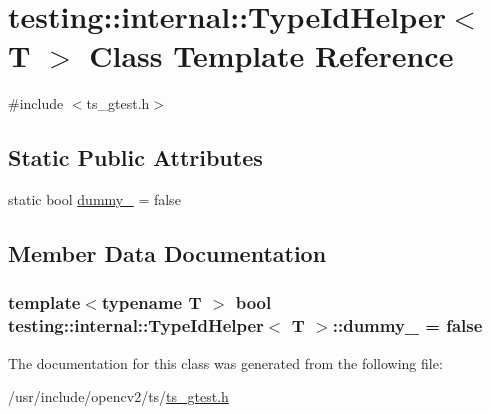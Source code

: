 \hypertarget{classtesting_1_1internal_1_1TypeIdHelper}{\section{testing\-:\-:internal\-:\-:Type\-Id\-Helper$<$ T $>$ Class Template Reference}
\label{classtesting_1_1internal_1_1TypeIdHelper}
}


{\ttfamily \#include $<$ts\-\_\-gtest.\-h$>$}

\subsection*{Static Public Attributes}
\begin{DoxyCompactItemize}
\item 
static bool \hyperlink{classtesting_1_1internal_1_1TypeIdHelper_a372268b1520d965d0bdf01ebad3d270e}{dummy\-\_\-} = false
\end{DoxyCompactItemize}


\subsection{Member Data Documentation}
\hypertarget{classtesting_1_1internal_1_1TypeIdHelper_a372268b1520d965d0bdf01ebad3d270e}{
\subsubsection[{dummy\-\_\-}]{\setlength{\rightskip}{0pt plus 5cm}template$<$typename T $>$ bool {\bf testing\-::internal\-::\-Type\-Id\-Helper}$<$ {\bf T} $>$\-::dummy\-\_\- = false\hspace{0.3cm}{\ttfamily [static]}}}\label{classtesting_1_1internal_1_1TypeIdHelper_a372268b1520d965d0bdf01ebad3d270e}


The documentation for this class was generated from the following file\-:\begin{DoxyCompactItemize}
\item 
/usr/include/opencv2/ts/\hyperlink{ts__gtest_8h}{ts\-\_\-gtest.\-h}\end{DoxyCompactItemize}
